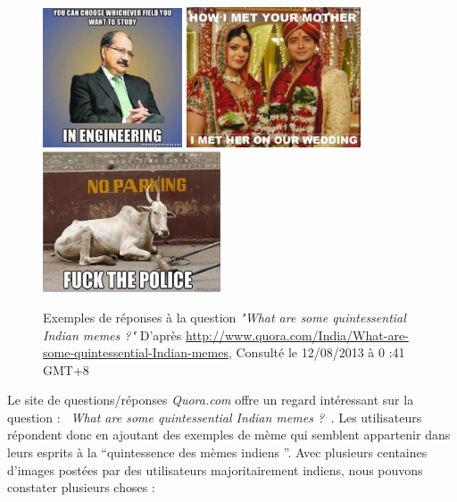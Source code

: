 \begin{figure}[htbp]
    \centering
    \includegraphics[width=1.6224in,height=1.6224in]{figures/chap2/chapitre2-img5.jpg}
    \includegraphics[width=2.0449in,height=1.6335in]{figures/chap2/chapitre2-img6.jpg}
    \includegraphics[width=2.078in,height=1.6449in]{figures/chap2/chapitre2-img7.jpg}
    \caption[Réponses à la question à propos des mèmes indiens sur Quora]{Exemples de réponses à la question \textit{"What are some quintessential Indian memes ?"} D'après \url{http://www.quora.com/India/What-are-some-quintessential-Indian-memes}, Consulté le 12/08/2013 à 0 :41 GMT+8 }
    \label{fig:quora-india}
\end{figure}


Le site de questions/réponses \textit{Quora.com} offre un regard intéressant sur la question : \textit{{\guillemotleft}~What are some quintessential Indian memes ?~{\guillemotright}.} Les utilisateurs répondent donc en ajoutant des exemples de mème qui semblent appartenir dans leurs esprits à la {\textquotedblleft}quintessence des mèmes indiens {\textquotedblright}. 
 Avec plusieurs centaines d{\textquoteright}images postées par des
utilisateurs majoritairement indiens, nous pouvons constater plusieurs choses : 


